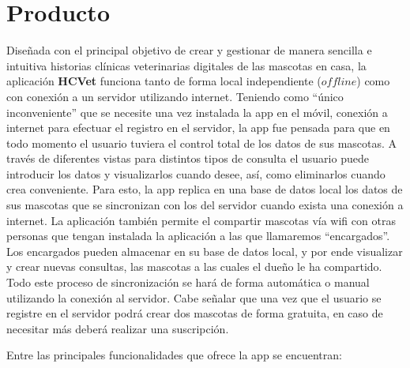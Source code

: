 \chapter{Producto}\label{chapter:proposal}

Diseñada con el principal objetivo de crear y gestionar de manera sencilla e intuitiva historias clínicas veterinarias digitales de las mascotas en casa, la aplicación \textbf{HCVet} funciona tanto de forma local independiente ($offline$) como con conexión a un servidor utilizando internet. Teniendo como “único inconveniente” que se necesite una vez instalada la app en el móvil, conexión a internet para efectuar el registro en el servidor, la app fue pensada para que en todo momento el usuario tuviera el control total de los datos de sus mascotas. A través de diferentes vistas para distintos tipos de consulta el usuario puede introducir los datos y visualizarlos cuando desee, así, como eliminarlos cuando crea conveniente. Para esto, la app replica en una base de datos local los datos de sus mascotas que se sincronizan con los del servidor cuando exista una conexión a internet. La aplicación también permite el compartir mascotas vía wifi con otras personas que tengan instalada la aplicación a las que llamaremos “encargados”. Los encargados pueden almacenar en su base de datos local, y por ende visualizar y crear nuevas consultas, las mascotas a las cuales el dueño le ha compartido. Todo este proceso de sincronización se hará de forma automática o manual utilizando la conexión al servidor. Cabe señalar que una vez que el usuario se registre en el servidor podrá crear dos mascotas de forma gratuita, en caso de necesitar más deberá realizar una suscripción.

Entre las principales funcionalidades que ofrece la app se encuentran:

